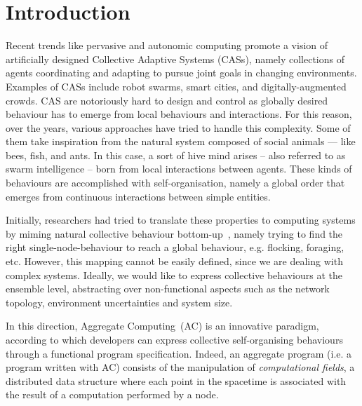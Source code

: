 \documentclass[conference]{IEEEtran}
\begin{document}
\section{Introduction}
Recent trends like pervasive and autonomic computing 
 promote a vision of artificially designed Collective Adaptive Systems (CASs),
 namely collections of agents coordinating and adapting %
 to pursue joint goals in changing environments.
 Examples of CASs include robot swarms, smart cities, and digitally-augmented crowds.
%
%
CAS are notoriously hard to design and control 
 as globally desired behaviour
 has to emerge from local behaviours and interactions. 
For this reason, over the years, various approaches have tried to handle this complexity. Some of them take inspiration from the natural system composed of social animals --- like bees, fish, and ants. 
%
In this case, a sort of hive mind arises -- 
 also referred to as swarm intelligence --  
 born from local interactions between agents. 
%
These kinds of behaviours are accomplished with self-organisation, 
 namely a global order that emerges from continuous 
 interactions between simple entities.

Initially, researchers had tried to translate these properties to computing systems by miming natural collective behaviour bottom-up~\cite{DBLP:journals/connection/Webb02}, 
 namely trying to find the right single-node-behaviour 
 to reach a global behaviour, e.g. flocking, foraging, etc.
%
However, this mapping cannot be easily defined, since we are dealing with complex systems.
%
Ideally, we would like to express collective behaviours at the ensemble level,
 abstracting over non-functional aspects such as the network topology, environment uncertainties and 
 system size.

In this direction, Aggregate Computing~\cite{DBLP:journals/computer/BealPV15}(AC) is an innovative paradigm, according to which
 developers can express collective self-organising behaviours through a functional program specification.
%
Indeed, an aggregate program (i.e. a program written with AC) consists of the manipulation of \textit{computational fields}, a distributed
 data structure where each point in the spacetime is associated with the result of a computation
 performed by a node.
%
\end{document}
